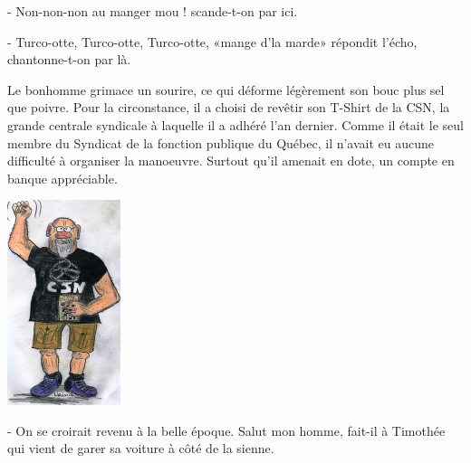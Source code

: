 
- Non-non-non au manger mou ! scande-t-on par ici.

- Turco-otte, Turco-otte, Turco-otte, «mange d’la marde» répondit l’écho, chantonne-t-on par là.

Le bonhomme grimace un sourire, ce qui déforme légèrement son bouc plus sel que poivre. Pour la circonstance, il a choisi de revêtir son T-Shirt de la CSN, la grande centrale syndicale à laquelle il a adhéré l’an dernier. Comme il était le seul membre du Syndicat de la fonction publique du Québec, il n’avait eu aucune difficulté à organiser la manoeuvre. Surtout qu’il amenait en dote, un compte en banque appréciable.

\begin{floatingfigure}[l]{40mm}
\includegraphics[height=60mm]{corps/chapitre7/img/personnage-sebastien.jpg}
\end{floatingfigure}

- On se croirait revenu à la belle époque. Salut mon homme, fait-il à Timothée qui vient de garer sa voiture à côté de la sienne.

